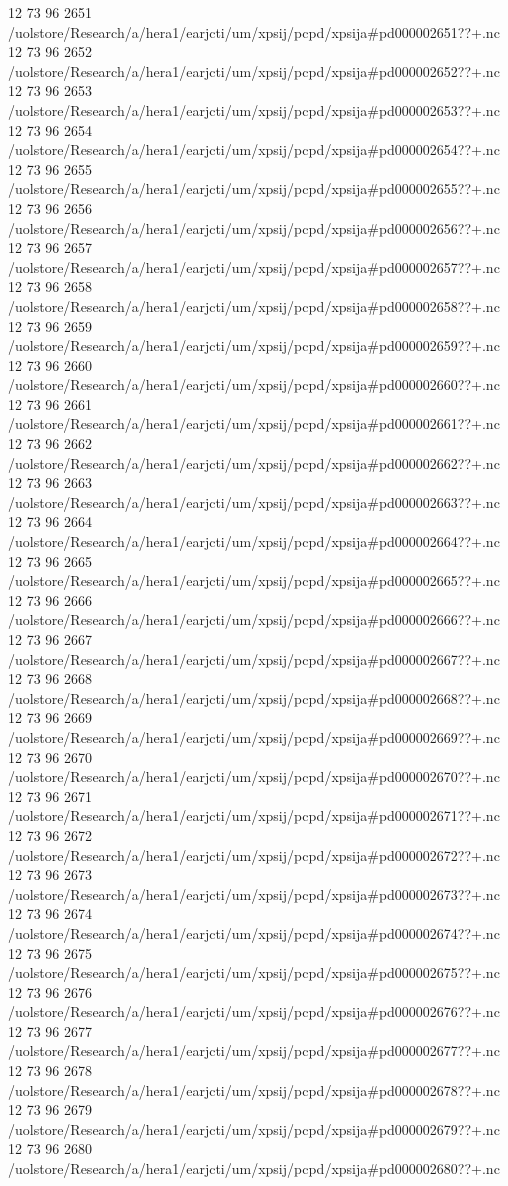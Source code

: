 12 73 96
2651
/uolstore/Research/a/hera1/earjcti/um/xpsij/pcpd/xpsija#pd000002651??+.nc
12 73 96
2652
/uolstore/Research/a/hera1/earjcti/um/xpsij/pcpd/xpsija#pd000002652??+.nc
12 73 96
2653
/uolstore/Research/a/hera1/earjcti/um/xpsij/pcpd/xpsija#pd000002653??+.nc
12 73 96
2654
/uolstore/Research/a/hera1/earjcti/um/xpsij/pcpd/xpsija#pd000002654??+.nc
12 73 96
2655
/uolstore/Research/a/hera1/earjcti/um/xpsij/pcpd/xpsija#pd000002655??+.nc
12 73 96
2656
/uolstore/Research/a/hera1/earjcti/um/xpsij/pcpd/xpsija#pd000002656??+.nc
12 73 96
2657
/uolstore/Research/a/hera1/earjcti/um/xpsij/pcpd/xpsija#pd000002657??+.nc
12 73 96
2658
/uolstore/Research/a/hera1/earjcti/um/xpsij/pcpd/xpsija#pd000002658??+.nc
12 73 96
2659
/uolstore/Research/a/hera1/earjcti/um/xpsij/pcpd/xpsija#pd000002659??+.nc
12 73 96
2660
/uolstore/Research/a/hera1/earjcti/um/xpsij/pcpd/xpsija#pd000002660??+.nc
12 73 96
2661
/uolstore/Research/a/hera1/earjcti/um/xpsij/pcpd/xpsija#pd000002661??+.nc
12 73 96
2662
/uolstore/Research/a/hera1/earjcti/um/xpsij/pcpd/xpsija#pd000002662??+.nc
12 73 96
2663
/uolstore/Research/a/hera1/earjcti/um/xpsij/pcpd/xpsija#pd000002663??+.nc
12 73 96
2664
/uolstore/Research/a/hera1/earjcti/um/xpsij/pcpd/xpsija#pd000002664??+.nc
12 73 96
2665
/uolstore/Research/a/hera1/earjcti/um/xpsij/pcpd/xpsija#pd000002665??+.nc
12 73 96
2666
/uolstore/Research/a/hera1/earjcti/um/xpsij/pcpd/xpsija#pd000002666??+.nc
12 73 96
2667
/uolstore/Research/a/hera1/earjcti/um/xpsij/pcpd/xpsija#pd000002667??+.nc
12 73 96
2668
/uolstore/Research/a/hera1/earjcti/um/xpsij/pcpd/xpsija#pd000002668??+.nc
12 73 96
2669
/uolstore/Research/a/hera1/earjcti/um/xpsij/pcpd/xpsija#pd000002669??+.nc
12 73 96
2670
/uolstore/Research/a/hera1/earjcti/um/xpsij/pcpd/xpsija#pd000002670??+.nc
12 73 96
2671
/uolstore/Research/a/hera1/earjcti/um/xpsij/pcpd/xpsija#pd000002671??+.nc
12 73 96
2672
/uolstore/Research/a/hera1/earjcti/um/xpsij/pcpd/xpsija#pd000002672??+.nc
12 73 96
2673
/uolstore/Research/a/hera1/earjcti/um/xpsij/pcpd/xpsija#pd000002673??+.nc
12 73 96
2674
/uolstore/Research/a/hera1/earjcti/um/xpsij/pcpd/xpsija#pd000002674??+.nc
12 73 96
2675
/uolstore/Research/a/hera1/earjcti/um/xpsij/pcpd/xpsija#pd000002675??+.nc
12 73 96
2676
/uolstore/Research/a/hera1/earjcti/um/xpsij/pcpd/xpsija#pd000002676??+.nc
12 73 96
2677
/uolstore/Research/a/hera1/earjcti/um/xpsij/pcpd/xpsija#pd000002677??+.nc
12 73 96
2678
/uolstore/Research/a/hera1/earjcti/um/xpsij/pcpd/xpsija#pd000002678??+.nc
12 73 96
2679
/uolstore/Research/a/hera1/earjcti/um/xpsij/pcpd/xpsija#pd000002679??+.nc
12 73 96
2680
/uolstore/Research/a/hera1/earjcti/um/xpsij/pcpd/xpsija#pd000002680??+.nc
